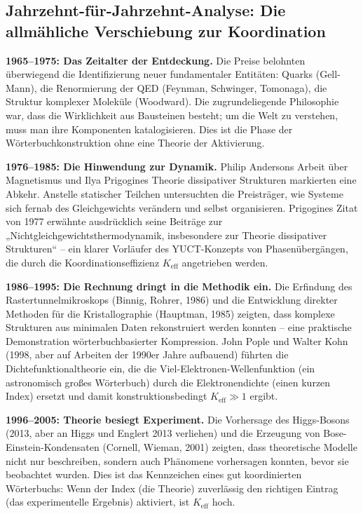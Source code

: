 \documentclass[12pt,a4paper]{article}
\begin{document}
	\subsection{Jahrzehnt-für-Jahrzehnt-Analyse: Die allmähliche Verschiebung zur Koordination}
	
	\textbf{1965–1975: Das Zeitalter der Entdeckung.} Die Preise belohnten überwiegend die Identifizierung neuer fundamentaler Entitäten: Quarks (Gell-Mann), die Renormierung der QED (Feynman, Schwinger, Tomonaga), die Struktur komplexer Moleküle (Woodward). Die zugrundeliegende Philosophie war, dass die Wirklichkeit aus Bausteinen besteht; um die Welt zu verstehen, muss man ihre Komponenten katalogisieren. Dies ist die Phase der Wörterbuchkonstruktion ohne eine Theorie der Aktivierung.
	
	\textbf{1976–1985: Die Hinwendung zur Dynamik.} Philip Andersons Arbeit über Magnetismus und Ilya Prigogines Theorie dissipativer Strukturen markierten eine Abkehr. Anstelle statischer Teilchen untersuchten die Preisträger, wie Systeme sich fernab des Gleichgewichts verändern und selbst organisieren. Prigogines Zitat von 1977 erwähnte ausdrücklich seine Beiträge zur „Nichtgleichgewichtsthermodynamik, insbesondere zur Theorie dissipativer Strukturen“ – ein klarer Vorläufer des YUCT-Konzepts von Phasenübergängen, die durch die Koordinationseffizienz \(K_{\mathrm{eff}}\) angetrieben werden.
	
	\textbf{1986–1995: Die Rechnung dringt in die Methodik ein.} Die Erfindung des Rastertunnelmikroskops (Binnig, Rohrer, 1986) und die Entwicklung direkter Methoden für die Kristallographie (Hauptman, 1985) zeigten, dass komplexe Strukturen aus minimalen Daten rekonstruiert werden konnten – eine praktische Demonstration wörterbuchbasierter Kompression. John Pople und Walter Kohn (1998, aber auf Arbeiten der 1990er Jahre aufbauend) führten die Dichtefunktionaltheorie ein, die die Viel-Elektronen-Wellenfunktion (ein astronomisch großes Wörterbuch) durch die Elektronendichte (einen kurzen Index) ersetzt und damit konstruktionsbedingt \(K_{\mathrm{eff}} \gg 1\) ergibt.
	
	\textbf{1996–2005: Theorie besiegt Experiment.} Die Vorhersage des Higgs-Bosons (2013, aber an Higgs und Englert 2013 verliehen) und die Erzeugung von Bose-Einstein-Kondensaten (Cornell, Wieman, 2001) zeigten, dass theoretische Modelle nicht nur beschreiben, sondern auch Phänomene vorhersagen konnten, bevor sie beobachtet wurden. Dies ist das Kennzeichen eines gut koordinierten Wörterbuchs: Wenn der Index (die Theorie) zuverlässig den richtigen Eintrag (das experimentelle Ergebnis) aktiviert, ist \(K_{\mathrm{eff}}\) hoch.
	
\end{document}
